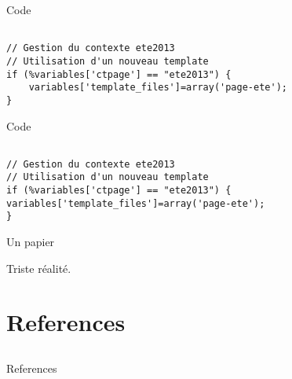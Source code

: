 \documentclass[10pt]{beamer}
\begin{document}
\begin{frame}[fragile]{Code}
\begin{lstlisting}

// Gestion du contexte ete2013
// Utilisation d'un nouveau template
if (%variables['ctpage'] == "ete2013") {
    variables['template_files']=array('page-ete');
}
\end{lstlisting}
\end{frame}

\begin{frame}[fragile]{Code}
\begin{verbatim}

// Gestion du contexte ete2013
// Utilisation d'un nouveau template
if (%variables['ctpage'] == "ete2013") {
variables['template_files']=array('page-ete');
}
\end{verbatim}
\end{frame}

\begin{frame}{Un papier}

\begin{alertblock}{ \cite{Ioannidis_2005}}

Triste réalité.	
	
\end{alertblock}

\end{frame}

\section{References} \subsection{}

\begin{frame}[allowframebreaks]{References}

\printbibliography[heading=none]

\end{frame}

\end{document}
